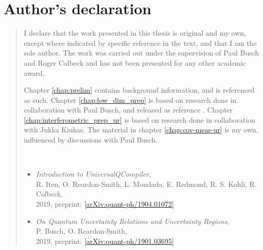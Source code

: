%
%
%
%
%
%
\chapter*{Author's declaration}
\begin{SingleSpace}
\begin{quote}

I declare that the work presented in this thesis is original and my own, except where indicated by specific reference in the text, and that I am the sole author. The work was carried out under the supervision of Paul Busch and Roger Colbeck and has not been presented for any other academic award.

Chapter \ref{chap:prelim} contains background information, and is referenced as such. Chapter \ref{chap:low_dim_prep} is based on research done in collaboration with Paul Busch, and released as reference \cite{pb-ors-u-regions-u-relations}. Chapter \ref{chap:interferometric_prep_ur} is based on research done in collaboration with Jukka Kiukas. The material in chapter \ref{chap:cov-meas-ur} is my own, influenced by discussions with Paul Busch.

\bigskip

\bigskip

\bigskip

\bigskip

\bigskip

\\

\begin{itemize}
\item {\em Introduction to UniversalQCompiler}, \\ R. Iten, O. Reardon-Smith, L. Mondada, E. Redmond, R. S. Kohli, R. Colbeck, \\2019, preprint: \href{https://arxiv.org/abs/1904.01072}{[arXiv:quant-ph/1904.01072]}
\item {\em On Quantum Uncertainty Relations and Uncertainty Regions}, \\P. Busch, O. Reardon-Smith, \\2019, preprint: \href{https://arxiv.org/abs/1901.03695}{[arXiv:quant-ph/1901.03695]}
\end{itemize}


\end{quote}
\end{SingleSpace}
\clearpage